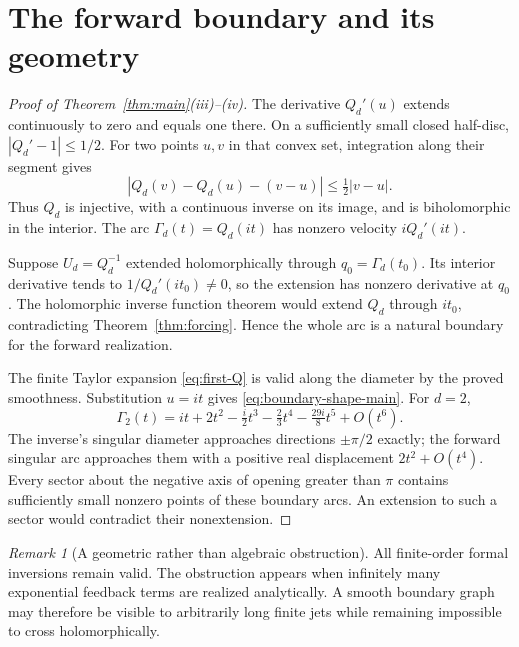 \documentclass[11pt,a4paper]{article}
\numberwithin{equation}{section}
\theoremstyle{definition}\newtheorem{definition}[theorem]{Definition}
\theoremstyle{remark}\newtheorem{remark}[theorem]{Remark}
\theoremstyle{definition}
\begin{document}
\section{The forward boundary and its geometry}
\label{sec:geometry}
\begin{proof}[Proof of Theorem~\ref{thm:main}(iii)--(iv)]
The derivative $Q_d'(u)$ extends continuously to zero and equals one there.
On a sufficiently small closed half-disc, $|Q_d'-1|\le1/2$. For two points
$u,v$ in that convex set, integration along their segment gives
\[
 |Q_d(v)-Q_d(u)-(v-u)|\le\tfrac12|v-u|.
\]
Thus $Q_d$ is injective, with a continuous inverse on its image, and is
biholomorphic in the interior. The arc $\Gamma_d(t)=Q_d(it)$ has nonzero
velocity $iQ_d'(it)$.

Suppose $U_d=Q_d^{-1}$ extended holomorphically through
$q_0=\Gamma_d(t_0)$. Its interior derivative tends to $1/Q_d'(it_0)\ne0$,
so the extension has nonzero derivative at $q_0$. The holomorphic inverse
function theorem would extend $Q_d$ through $it_0$, contradicting
Theorem~\ref{thm:forcing}. Hence the whole arc is a natural boundary for the
forward realization.

The finite Taylor expansion \eqref{eq:first-Q} is valid along the diameter
by the proved smoothness. Substitution $u=it$ gives
\eqref{eq:boundary-shape-main}. For $d=2$,
\begin{equation}
 \Gamma_2(t)=it+2t^2-\tfrac{i}{2}t^3-\tfrac23t^4
                     -\tfrac{29i}{8}t^5+O(t^6).
 \label{eq:boundary-five}
\end{equation}
The inverse's singular diameter approaches directions $\pm\pi/2$ exactly;
the forward singular arc approaches them with a positive real displacement
$2t^2+O(t^4)$. Every sector about the negative axis of opening greater than
$\pi$ contains sufficiently small nonzero points of these boundary arcs.
An extension to such a sector would contradict their nonextension.
\end{proof}

\begin{remark}[A geometric rather than algebraic obstruction]
All finite-order formal inversions remain valid. The obstruction appears
when infinitely many exponential feedback terms are realized analytically.
A smooth boundary graph may therefore be visible to arbitrarily long finite
jets while remaining impossible to cross holomorphically.
\end{remark}
\end{document}
